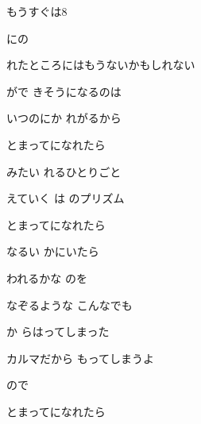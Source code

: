 \documentclass[a4paper,tate,twocolumn,12pt]{ltjtarticle}
\begin{document}
\begin{flushleft}
\vspace{2em}

\noindent\begin{minipage}{\linewidth}
もうすぐは8

にの

 れたところにはもうないかもしれない
\end{minipage}

\vspace{2em}

\noindent\begin{minipage}{\linewidth}
がで きそうになるのは

いつのにか れがるから
\end{minipage}

\vspace{2em}

\noindent\begin{minipage}{\linewidth}
とまってになれたら

みたい れるひとりごと

えていく は のプリズム

とまってになれたら

なるい かにいたら

われるかな のを

なぞるような こんなでも
\end{minipage}

\vspace{2em}

\noindent\begin{minipage}{\linewidth}
か らはってしまった

カルマだから もってしまうよ

ので
\end{minipage}

\vspace{2em}

\noindent\begin{minipage}{\linewidth}
とまってになれたら


\end{minipage}
\end{flushleft}
\end{document}
